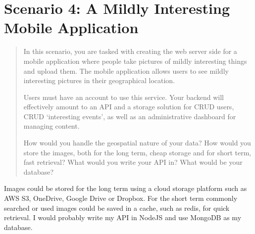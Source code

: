 \documentclass[12pt, letterpaper]{homework}
\begin{document}
\pagebreak{}
\section*{Scenario 4: A Mildly Interesting Mobile Application}

\begin{quote}
    In this scenario, you are tasked with creating the web server side for a mobile
    application where people take pictures of mildly interesting things and upload
    them. The mobile application allows users to see mildly interesting pictures in
    their geographical location.

    Users must have an account to use this service. Your backend will effectively
    amount to an API and a storage solution for CRUD users, CRUD `interesting
    events', as well as an administrative dashboard for managing content.

    How would you handle the geospatial nature of your data? How would you store the
    images, both for the long term, cheap storage and for short term, fast
    retrieval? What would you write your API in? What would be your database?
\end{quote}

Images could be stored for the long term using a cloud storage platform such as
AWS S3, OneDrive, Google Drive or Dropbox. For the short term commonly searched
or used images could be saved in a cache, such as redis, for quick retrieval. I
would probably write my API in NodeJS and use MongoDB as my database.
\end{document}
